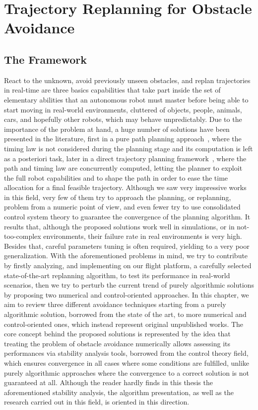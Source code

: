 \chapter{Trajectory Replanning for Obstacle Avoidance}%
\label{CH:AVOIDANCE}

\section{The Framework}
React to the unknown, avoid previously unseen obstacles, and replan trajectories in real-time are three basics capabilities
that take part inside the set of elementary abilities that an autonomous robot must master before being able to start moving in
real-world environments, cluttered of objects, people, animals, cars, and hopefully other robots, which may behave unpredictably.
Due to the importance of the problem at hand, a huge number of solutions have been presented in the literature, first in a pure
path planning approach~\cite{mehdi2015collision}, where the timing law is not considered during the planning stage and its computation
is left as a posteriori task, later in a direct trajectory planning framework~\cite{ding2019efficient}, where the path and timing law
are concurrently computed, letting the planner to exploit the full robot capabilities and to shape the path in order to ease the
time allocation for a final feasible trajectory. Although we saw very impressive works in this field, very few of them try to
approach the planning, or replanning, problem from a numeric point of view, and even fewer try to use consolidated control system
theory to guarantee the convergence of the planning algorithm. It results that, although the proposed solutions work well in 
simulations, or in not-too-complex environments, their failure rate in real environments is very high. Besides that, careful
parameters tuning is often required, yielding to a very poor generalization. With the aforementioned problems in mind, we try to
contribute by firstly analyzing, and implementing on our flight platform, a carefully selected state-of-the-art replanning algorithm,
to test its performance in real-world scenarios, then we try to perturb the current trend of purely algorithmic solutions
by proposing two numerical and control-oriented approaches.
In this chapter, we aim to review three different avoidance techniques starting from a purely algorithmic solution, borrowed from
the state of the art, to more numerical and control-oriented ones, which instead represent original unpublished works.
The core concept behind the proposed solutions is represented by the idea that treating the problem of obstacle avoidance numerically
allows assessing its performances via stability analysis tools, borrowed from the control theory field, which ensures convergence in
all cases where some conditions are fulfilled, unlike purely algorithmic approaches where the convergence to a correct solution is not
guaranteed at all. Although the reader hardly finds in this thesis the aforementioned stability analysis, the algorithm presentation, as well
as the research carried out in this field, is oriented in this direction.

